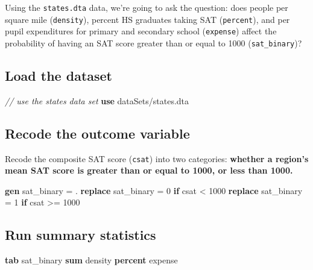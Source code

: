 \documentclass[
]{book}
\newenvironment{Shaded}{\begin{snugshade}}{\end{snugshade}}
\newcommand{\CommentTok}[1]{\textcolor[rgb]{0.56,0.35,0.01}{\textit{#1}}}
\newcommand{\KeywordTok}[1]{\textcolor[rgb]{0.13,0.29,0.53}{\textbf{#1}}}
\newcommand{\NormalTok}[1]{#1}
\begin{document}
Using the \texttt{states.dta} data, we're going to ask the question: does people per square mile (\texttt{density}), percent HS graduates taking SAT (\texttt{percent}), and per pupil expenditures for primary and secondary school (\texttt{expense}) affect the probability of having an SAT score greater than or equal to 1000 (\texttt{sat\_binary})?

\hypertarget{load-the-dataset}{%
\subsection{Load the dataset}\label{load-the-dataset}}

\begin{Shaded}
\begin{Highlighting}[]
\CommentTok{// use the states data set}
\KeywordTok{use}\NormalTok{ dataSets/states.dta}
\end{Highlighting}
\end{Shaded}

\hypertarget{recode-the-outcome-variable}{%
\subsection{Recode the outcome variable}\label{recode-the-outcome-variable}}

Recode the composite SAT score (\texttt{csat}) into two categories: \textbf{whether a region's mean SAT score is greater than or equal to 1000, or less than 1000.}

\begin{Shaded}
\begin{Highlighting}[]
\KeywordTok{gen}\NormalTok{ sat\_binary = .}
\KeywordTok{replace}\NormalTok{ sat\_binary = 0 }\KeywordTok{if}\NormalTok{ csat \textless{} 1000}
\KeywordTok{replace}\NormalTok{ sat\_binary = 1 }\KeywordTok{if}\NormalTok{ csat \textgreater{}= 1000}
\end{Highlighting}
\end{Shaded}

\hypertarget{run-summary-statistics}{%
\subsection{Run summary statistics}\label{run-summary-statistics}}

\begin{Shaded}
\begin{Highlighting}[]
\KeywordTok{tab}\NormalTok{ sat\_binary}
\KeywordTok{sum}\NormalTok{ density }\KeywordTok{percent}\NormalTok{ expense }
\end{Highlighting}
\end{Shaded}
\end{document}
